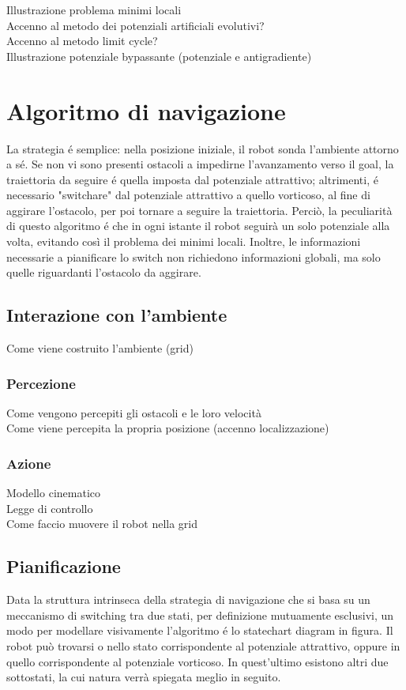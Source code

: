 \documentclass[14pt,twoside,a4paper]{extarticle}
\begin{document}
Illustrazione problema minimi locali\\
Accenno al metodo dei potenziali artificiali evolutivi?\\
Accenno al metodo limit cycle?\\
Illustrazione potenziale bypassante (potenziale e antigradiente)

\section{Algoritmo di navigazione\cite{dalfonso}} 
La strategia é semplice: nella posizione iniziale, il robot sonda l'ambiente attorno a sé. Se non vi sono presenti ostacoli a impedirne l'avanzamento verso il goal, la traiettoria da seguire é quella imposta dal potenziale attrattivo; altrimenti, é necessario "switchare" dal potenziale attrattivo a quello vorticoso, al fine di aggirare l'ostacolo, per poi tornare a seguire la traiettoria. Perciò, la peculiarità di questo algoritmo é che in ogni istante il robot seguirà un solo potenziale alla volta, evitando così il problema dei minimi locali. Inoltre, le informazioni necessarie a pianificare lo switch non richiedono informazioni globali, ma solo quelle riguardanti l'ostacolo da aggirare.

\subsection{Interazione con l'ambiente}
Come viene costruito l'ambiente (grid)\\
\subsubsection{Percezione}
Come vengono percepiti gli ostacoli e le loro velocità\\
Come viene percepita la propria posizione (accenno localizzazione)\\
\subsubsection{Azione}
Modello cinematico\\
Legge di controllo\\
Come faccio muovere il robot nella grid

\subsection{Pianificazione}
Data la struttura intrinseca della strategia di navigazione che si basa su un meccanismo di switching tra due stati, per definizione mutuamente esclusivi, un modo per modellare visivamente l'algoritmo é lo statechart diagram in figura. Il robot può trovarsi o nello stato corrispondente al potenziale attrattivo, oppure in quello corrispondente al potenziale vorticoso. In quest'ultimo esistono altri due sottostati, la cui natura verrà spiegata meglio in seguito.
	
\end{document}
